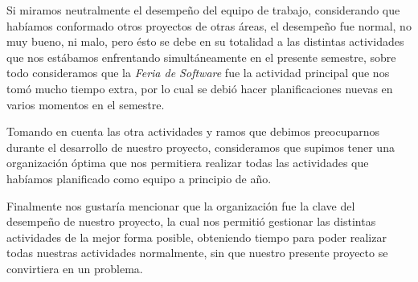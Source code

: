 
Si miramos neutralmente el desempeño del equipo de trabajo,
considerando que habíamos conformado otros proyectos de otras áreas,
el desempeño fue normal, no muy bueno, ni malo, pero ésto
se debe en su totalidad a las distintas actividades que nos estábamos
enfrentando simultáneamente en el presente semestre, sobre todo
consideramos que la \emph{Feria de Software} fue la actividad principal
que nos tomó mucho tiempo extra, por lo cual se debió hacer planificaciones
nuevas en varios momentos en el semestre.

Tomando en cuenta las otra actividades y ramos que debimos preocuparnos
durante el desarrollo de nuestro proyecto, consideramos que supimos
tener una organización óptima que nos permitiera realizar todas las actividades
que habíamos planificado como equipo a principio de año.

Finalmente nos gustaría mencionar que la organización fue la clave del desempeño
de nuestro proyecto, la cual nos permitió gestionar las distintas actividades
de la mejor forma posible, obteniendo tiempo para poder realizar todas nuestras
actividades normalmente, sin que nuestro presente proyecto se convirtiera en un
problema.

